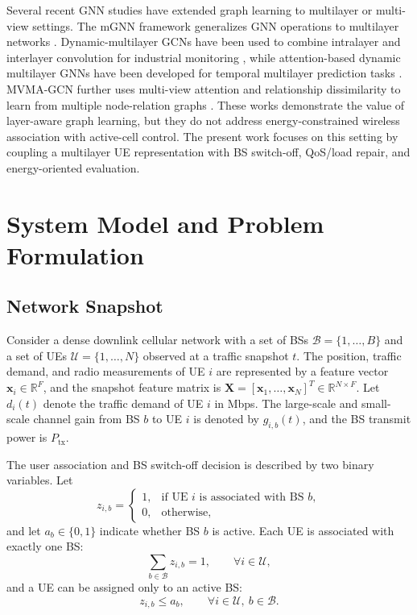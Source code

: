 \documentclass[journal]{IEEEtran}
\begin{document}
Several recent GNN studies have extended graph learning to multilayer or
multi-view settings. The mGNN framework generalizes GNN operations to
multilayer networks \cite{grassia2021mgnn}. Dynamic-multilayer GCNs have been
used to combine intralayer and interlayer convolution for industrial monitoring
\cite{zhang2023dynamic}, while attention-based dynamic multilayer GNNs have
been developed for temporal multilayer prediction tasks
\cite{zandi2025attention}. MVMA-GCN further uses multi-view attention and
relationship dissimilarity to learn from multiple node-relation graphs
\cite{zhang2023mvma}. These works demonstrate the value of layer-aware graph
learning, but they do not address energy-constrained wireless association with
active-cell control. The present work focuses on this setting by coupling a
multilayer UE representation with BS switch-off, QoS/load repair, and
energy-oriented evaluation.

\section{System Model and Problem Formulation}
\subsection{Network Snapshot}
Consider a dense downlink cellular network with a set of BSs
$\mathcal{B}=\{1,\ldots,B\}$ and a set of UEs
$\mathcal{U}=\{1,\ldots,N\}$ observed at a traffic snapshot $t$. The position,
traffic demand, and radio measurements of UE $i$ are represented by a feature
vector $\mathbf{x}_i\in\mathbb{R}^{F}$, and the snapshot feature matrix is
$\mathbf{X}=[\mathbf{x}_1,\ldots,\mathbf{x}_N]^{T}\in\mathbb{R}^{N\times F}$.
Let $d_i(t)$ denote the traffic demand of UE $i$ in Mbps. The large-scale and
small-scale channel gain from BS $b$ to UE $i$ is denoted by $g_{i,b}(t)$, and
the BS transmit power is $P_{\mathrm{tx}}$.

The user association and BS switch-off decision is described by two binary
variables. Let
\begin{equation}
    z_{i,b} =
    \begin{cases}
        1, & \text{if UE } i \text{ is associated with BS } b,\\
        0, & \text{otherwise,}
    \end{cases}
\end{equation}
and let $a_b\in\{0,1\}$ indicate whether BS $b$ is active. Each UE is
associated with exactly one BS:
\begin{equation}
    \sum_{b\in\mathcal{B}} z_{i,b}=1,\qquad \forall i\in\mathcal{U},
    \label{eq:association_constraint}
\end{equation}
and a UE can be assigned only to an active BS:
\begin{equation}
    z_{i,b}\leq a_b,\qquad \forall i\in\mathcal{U},\ b\in\mathcal{B}.
    \label{eq:active_constraint}
\end{equation}
\end{document}
